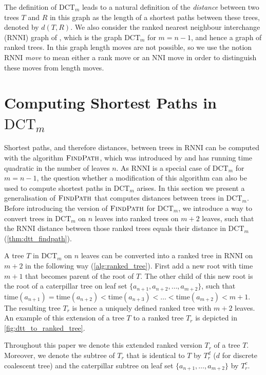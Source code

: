\documentclass[11pt]{amsart}
\newcommand{\rnni}{\mathrm{RNNI}}
\newcommand{\findpath}{\textsc{FindPath}}
\newcommand{\ntime}{\mathrm{time}}
\newcommand{\nni}{\mathrm{NNI}}
\newcommand{\dtt}{\mathrm{DCT}}
\newcommand{\summary}[1]{} %
\begin{document}
The definition of $\dtt_m$ leads to a natural definition of the \emph{distance} between two trees $T$ and $R$ in this graph as the length of a shortest paths between these trees, denoted by $d(T,R)$.
We also consider the ranked nearest neighbour interchange ($\rnni$) graph of \textcite{Collienne2020-iu}, which is the graph $\dtt_m$ for $m=n-1$, and hence a graph of ranked trees.
In this graph length moves are not possible, so we use the notion $\rnni$ \emph{move} to mean either a rank move or an $\nni$ move in order to distinguish these moves from length moves.


\section{Computing Shortest Paths in $\dtt_m$}
\label{section:fp_dtt}

\summary{Introduce how we can use $\findpath$ to compute $\dtt_m$ distances}
Shortest paths, and therefore distances, between trees in $\rnni$ can be computed with the algorithm $\findpath$, which was introduced by \textcite{Collienne2020-iu} and has running time quadratic in the number of leaves $n$.
As $\rnni$ is a special case of $\dtt_m$ for $m = n-1$, the question whether a modification of this algorithm can also be used to compute shortest paths in $\dtt_m$ arises.
In this section we present a generalisation of $\findpath$ that computes distances between trees in $\dtt_m$.
Before introducing the version of $\findpath$ for $\dtt_m$, we introduce a way to convert trees in $\dtt_m$ on $n$ leaves into ranked trees on $m+2$ leaves, such that the $\rnni$ distance between those ranked trees equals their distance in $\dtt_m$ (\autoref{thm:dtt_findpath}).

\summary{How to add leaves to a $\dtt_m$ tree to transform it into a ranked tree}
A tree $T$ in $\dtt_m$ on $n$ leaves can be converted into a ranked tree in $\rnni$ on $m+2$ in the following way (\autoref{alg:ranked_tree}).
First add a new root with time $m + 1$ that becomes parent of the root of $T$.
The other child of this new root is the root of a caterpillar tree on leaf set $\{a_{n+1}, a_{n+2}, \ldots, a_{m+2}\}$, such that $\ntime(a_{n+1}) = \ntime(a_{n+2}) < \ntime(a_{n+3}) < \ldots < \ntime(a_{m+2}) < m+1$.
The resulting tree $T_r$ is hence a uniquely defined ranked tree with $m+2$ leaves.
An example of this extension of a tree $T$ to a ranked tree $T_r$ is depicted in \autoref{fig:dtt_to_ranked_tree}.

Throughout this paper we denote this extended ranked version $T_r$ of a tree $T$.
Moreover, we denote the subtree of $T_r$ that is identical to $T$ by $T_r^d$ ($d$ for discrete coalescent tree) and the caterpillar subtree on leaf set $\{a_{n+1}, \ldots, a_{m+2}\}$ by $T_r^c$.
\end{document}
